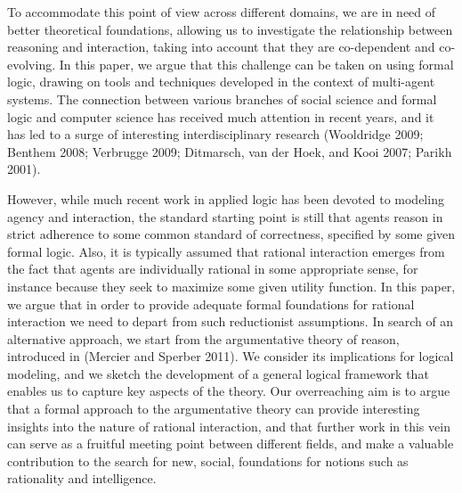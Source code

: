 \documentclass[greybox]{svmult}
\begin{document}
To accommodate this point of view across different domains, we are in need of better theoretical foundations, allowing us to investigate the relationship between reasoning and interaction, taking into account that they are co-dependent and co-evolving. In this paper, we argue that this challenge can be taken on using formal logic, drawing on tools and techniques developed in the context of multi-agent systems. The connection between various branches of social science and formal logic and computer science has received much attention in recent years, and it has led to a surge of interesting interdisciplinary research (Wooldridge 2009; Benthem 2008; Verbrugge 2009; Ditmarsch, van der Hoek, and Kooi 2007; Parikh 2001).

However, while much recent work in applied logic has been devoted to modeling agency and interaction, the standard starting point is still that agents reason in strict adherence to some common standard of correctness, specified by some given formal logic. Also, it is typically assumed that rational interaction emerges from the fact that agents are individually rational in some appropriate sense, for instance because they seek to maximize some given utility function. In this paper, we argue that in order to provide adequate formal foundations for rational interaction we need to depart from such reductionist assumptions. In search of an alternative approach, we start from the argumentative theory of reason, introduced in (Mercier and Sperber 2011). We consider its implications for logical modeling, and we sketch the development of a general logical framework that enables us to capture key aspects of the theory. Our overreaching aim is to argue that a formal approach to the argumentative theory can provide interesting insights into the nature of rational interaction, and that further work in this vein can serve as a fruitful meeting point between different fields, and make a valuable contribution to the search for new, social, foundations for notions such as rationality and intelligence.
\end{document}
